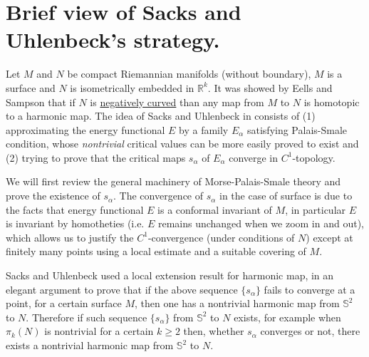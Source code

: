 \iffalse
\begin{info}
The PDF version of this page can be downloaded by replacing \texttt{html} in the its address by
\texttt{pdf}. 
For example \texttt{/html/sheaf-cohomology.html} should become \texttt{/pdf/sheaf-cohomology.pdf}.
\end{info}
\fi

\iffalse
This post is my reading note for \cite{sacks_existence_1981}. I want to present the authors'
ideas as clear as possible and I may probably skip a few (important) details and computations.
\fi

\section{Brief view of Sacks and Uhlenbeck's strategy.}
\label{sec:org3f79ab6}

Let \(M\) and \(N\) be compact Riemannian manifolds (without boundary), \(M\) is a
surface and \(N\) is isometrically embedded in \(\mathbb{R}^k\). It was showed by
Eells and Sampson \cite{eells_harmonic_1964} that if \(N\) is \href{harmonic-map-existence.org}{negatively curved} than any
map from \(M\) to \(N\) is homotopic to a harmonic map. The idea of Sacks and
Uhlenbeck in \cite{sacks_existence_1981} consists of (1) approximating the energy functional
\(E\) by a family \(E_\alpha\) satisfying Palais-Smale condition, whose
\emph{nontrivial} critical values can be more easily proved to exist and (2) trying to prove
that the critical maps \(s_\alpha\) of \(E_\alpha\) converge in \(C^1\)-topology.

We will first review the general machinery of Morse-Palais-Smale theory and prove the existence
of \(s_\alpha\). The convergence of \(s_\alpha\) in the case of surface is due to the
facts that energy functional \(E\) is a conformal invariant of \(M\), in particular \(E\) is
invariant by homotheties (i.e.  \(E\) remains unchanged when we zoom in and out), which
allows us to justify the \(C^1\)-convergence (under conditions of \(N\)) except at
finitely many points using a local estimate and a suitable
covering of \(M\). 

Sacks and Uhlenbeck used a local extension result for harmonic map, in an elegant argument
to prove that if the above sequence \(\{s_\alpha\}\) fails to converge at a point,
for a certain surface \(M\), then one has a nontrivial harmonic map from \(\mathbb{S}^2\) to \(N\). Therefore if such sequence \(\{ s_\alpha \}\) from \(\mathbb{S}^2\) to \(N\) exists, for example when \(\pi_k (N)\) is nontrivial for a certain \(k\geq 2\) then, 
whether \(s_\alpha\) converges or not, there exists a nontrivial harmonic map from \(\mathbb{S}^2\) to \(N\). 

